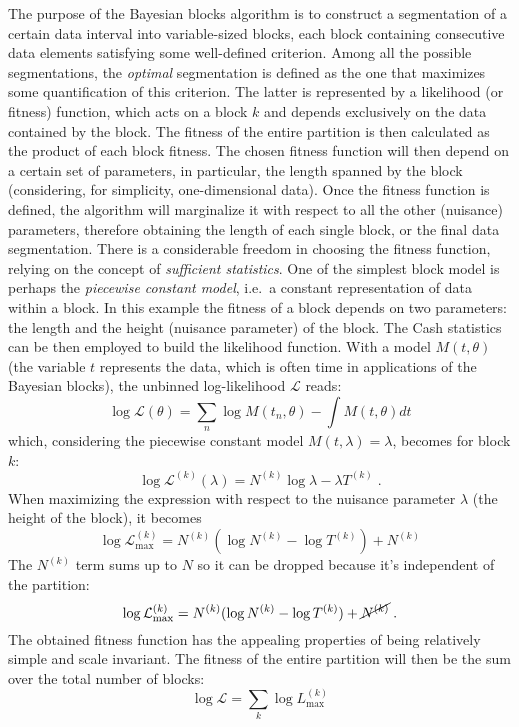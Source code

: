 The purpose of the Bayesian blocks algorithm is to construct a segmentation of a certain
data interval into variable-sized blocks, each block containing consecutive data elements
satisfying some well-defined criterion. Among all the possible segmentations, the
\emph{optimal} segmentation is defined as the one that maximizes some quantification of
this criterion. The latter is represented by a likelihood (or fitness) function, which
acts on a block $k$ and depends exclusively on the data contained by the block. The
fitness of the entire partition is then calculated as the product of each block fitness.
The chosen fitness function will then depend on a certain set of parameters, in
particular, the length spanned by the block (considering, for simplicity, one-dimensional
data). Once the fitness function is defined, the algorithm will marginalize it with
respect to all the other (nuisance) parameters, therefore obtaining the length of each
single block, or the final data segmentation.
\newpar
There is a considerable freedom in choosing the fitness function, relying on the concept
of \emph{sufficient statistics}. One of the simplest block model is perhaps the
\emph{piecewise constant model}, i.e.~a constant representation of data within a block. In
this example the fitness of a block depends on two parameters: the length and the height
(nuisance parameter) of the block. The Cash statistics can be then employed to build the
likelihood function. With a model $M(t, \theta)$ (the variable $t$ represents the data,
which is often time in applications of the Bayesian blocks), the unbinned log-likelihood
$\mathcal{L}$ reads:
\[
  \log \mathcal{L}(\theta) = \sum_n \log M(t_n, \theta) - \int M(t, \theta)dt
\]
which, considering the piecewise constant model $M(t, \lambda) = \lambda$, becomes for
block $k$:
\[
  \log \mathcal{L}^{(k)}(\lambda) = N^{(k)} \log\lambda - \lambda T^{(k)} \;.
\]
When maximizing the expression with respect to the nuisance parameter $\lambda$ (the
height of the block), it becomes
\[
  \log \mathcal{L}_\text{max}^{(k)} = N^{(k)}(\log N^{(k)} - \log T^{(k)}) + N^{(k)}
\]
The $N^{(k)}$ term sums up to $N$ so it can be dropped because it's independent of the
partition:
\[
  \log \mathcal{L}_\text{max}^{(k)} = N^{(k)}(\log N^{(k)} - \log T^{(k)}) + \cancel{N^{(k)}} \;.
\]
The obtained fitness function has the appealing properties of being relatively simple and
scale invariant. The fitness of the entire partition will then be the sum over the total
number of blocks:
\[
  \log \mathcal{L} = \sum_k \log L^{(k)}_\text{max}
\]

